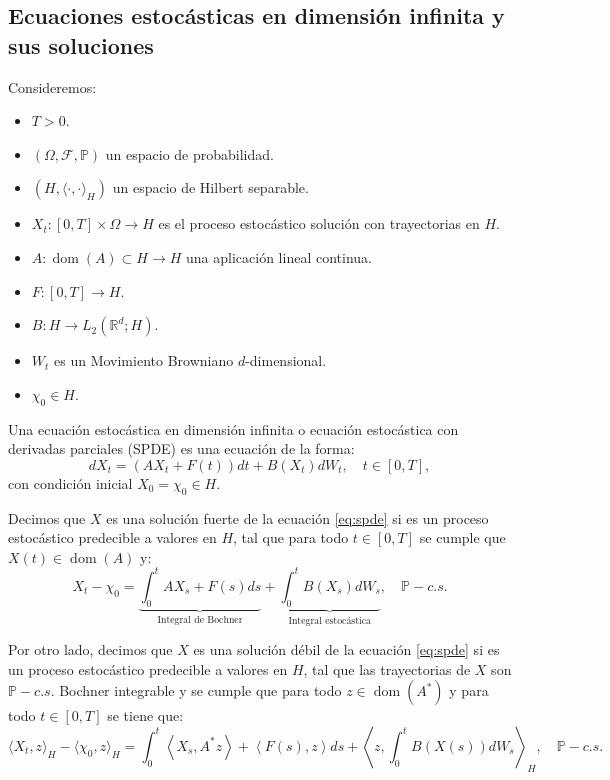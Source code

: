 \subsection{Ecuaciones estocásticas en dimensión infinita y sus soluciones}

Consideremos:
\begin{itemize}
  \item $T > 0$.
  \item $(\Omega, \mathcal{F}, \mathbb{P})$ un espacio de probabilidad.
  \item $(H, \langle\cdot, \cdot\rangle_H)$ un espacio de Hilbert separable.
  \item $X_t: [0, T] \times \Omega \to H$ es el proceso estocástico solución con trayectorias en $H$.
  \item $A: \operatorname{ dom }(A) \subset H \to H$ una aplicación lineal continua.
  \item $F: [0, T] \rightarrow H$.
  \item $B: H \to L_2(\mathbb{R}^d; H)$.
  \item $W_t$ es un Movimiento Browniano $d$-dimensional.
  \item $\chi_0 \in H$.
\end{itemize}

\begin{defn}
  Una ecuación estocástica en dimensión infinita o ecuación estocástica con derivadas parciales (SPDE) es una ecuación de la forma:
  \begin{equation}\label{eq:spde}
    d X_t = (A X_t + F(t))dt + B(X_t) d W_t, \quad t \in [0, T],
  \end{equation}
  con condición inicial $X_0 = \chi_0 \in H$.

  Decimos que $X$ es una solución fuerte de la ecuación \eqref{eq:spde} si es un proceso estocástico predecible a valores en $H$, tal que para todo $t \in [0, T]$ se cumple que $X(t) \in \operatorname{ dom }(A)$ y:
  \begin{equation}\label{eq:spde_strong_sol}
    X_t - \chi_0 = \underbrace{\int_0^t AX_s + F(s) ds}_{\text{Integral de Bochner}} + \underbrace{\int^t_0 B(X_s)dW_s}_{\text{Integral estocástica}}, \quad \mathbb{P}-c.s.
  \end{equation}

  Por otro lado, decimos que $X$ es una solución débil de la ecuación \eqref{eq:spde} si es un proceso estocástico predecible a valores en $H$, tal que las trayectorias de $X$ son $\mathbb{P}-c.s.$ Bochner integrable y se cumple que para todo $z \in \operatorname{ dom }(A^*)$ y para todo $t \in [0, T]$ se tiene que:
  \begin{equation}\label{eq:spde_weak_sol}
    \langle X_t, z \rangle_H - \langle \chi_0, z \rangle_H = \int_0^t \left\langle X_s , A^* z\right\rangle + \left\langle F(s), z\right\rangle ds  +  \left\langle z, \int^t_0 B(X(s)) dW_s\right\rangle_H, \quad \mathbb{P}-c.s.
  \end{equation}
\end{defn}

